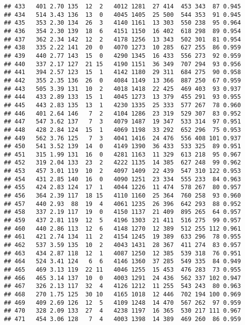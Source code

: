 \documentclass[]{article}
\begin{document}
\begin{verbatim}
## 433   401 2.70 135  12  2   4012 1281  27 414  453 343  87 0.945
## 434   514 3.43 136  13  0   4045 1405  25 500  544 353  91 0.945
## 435   353 2.30 134  26  3   4140 1161  13 303  550 238  95 0.964
## 436   354 2.30 139  18  6   4151 1150  16 402  618 298  89 0.954
## 437   362 2.34 142  12  2   4178 1256  13 343  502 301  81 0.954
## 438   335 2.22 141  20  0   4070 1273  10 285  627 255  86 0.959
## 439   440 2.77 143  15  0   4290 1345  16 433  556 273  92 0.959
## 440   337 2.17 127  21 15   4190 1151  36 349  707 294  93 0.956
## 441   394 2.57 123  15  1   4142 1180  29 311  684 275  90 0.958
## 442   355 2.35 136  26  0   4084 1149  13 366  887 250  67 0.959
## 443   505 3.39 131  10  2   4018 1418  22 425  469 403  93 0.937
## 444   433 2.89 133  15  1   4045 1273  13 379  455 291  93 0.955
## 445   443 2.83 135  13  1   4230 1335  25 333  577 267  78 0.960
## 446   401 2.64 146   7  2   4104 1286  23 319  529 307  83 0.952
## 447   547 3.62 137   7  3   4079 1487  19 347  533 314  97 0.951
## 448   428 2.84 124  15  1   4069 1198  33 292  652 296  75 0.953
## 449   562 3.76 125   7  3   4041 1416  24 476  556 408 101 0.937
## 450   541 3.52 139  14  0   4149 1390  36 433  533 325  89 0.951
## 451   315 1.99 131  16  0   4281 1163  11 329  613 218  95 0.967
## 452   319 2.04 133  23  2   4222 1135  14 385  627 248  99 0.962
## 453   457 3.01 119  10  2   4097 1409  22 439  547 310 122 0.953
## 454   431 2.85 140  16  0   4090 1251  23 334  555 233  84 0.963
## 455   424 2.83 124  17  1   4044 1226  11 474  578 267  80 0.957
## 456   364 2.39 117  18 15   4110 1160  25 364  760 258  93 0.960
## 457   440 2.93  88  19  4   4061 1235  26 396  642 293  88 0.952
## 458   337 2.19 117  19  0   4150 1137  21 409  895 265  64 0.957
## 459   437 2.81 119  12  5   4196 1303  21 411  516 275  99 0.957
## 460   440 2.86 113  12  6   4148 1270  12 389  512 255 112 0.961
## 461   421 2.74 134  11  2   4154 1245  19 389  633 296  78 0.955
## 462   537 3.59 135  10  2   4043 1431  28 367  411 274  83 0.957
## 463   434 2.87 118  12  1   4087 1250  12 385  539 318  76 0.951
## 464   524 3.41 124   6  6   4146 1360  37 285  549 335  84 0.949
## 465   469 3.13 119  22 11   4046 1255  15 453  476 283  73 0.955
## 466   465 3.14 137  10  0   4003 1291  24 436  562 337 102 0.947
## 467   326 2.13 117  32  4   4126 1212  11 255  543 243  80 0.963
## 468   270 1.75 125  30 10   4165 1018  12 446  702 194 100 0.969
## 469   409 2.69 126  12  5   4109 1248  14 470  567 262  97 0.959
## 470   328 2.09 133  27  4   4238 1197  16 365  530 217 111 0.967
## 471   454 3.06 128   7  4   4003 1398  14 389  469 260  86 0.959

\end{verbatim}
\end{document}
